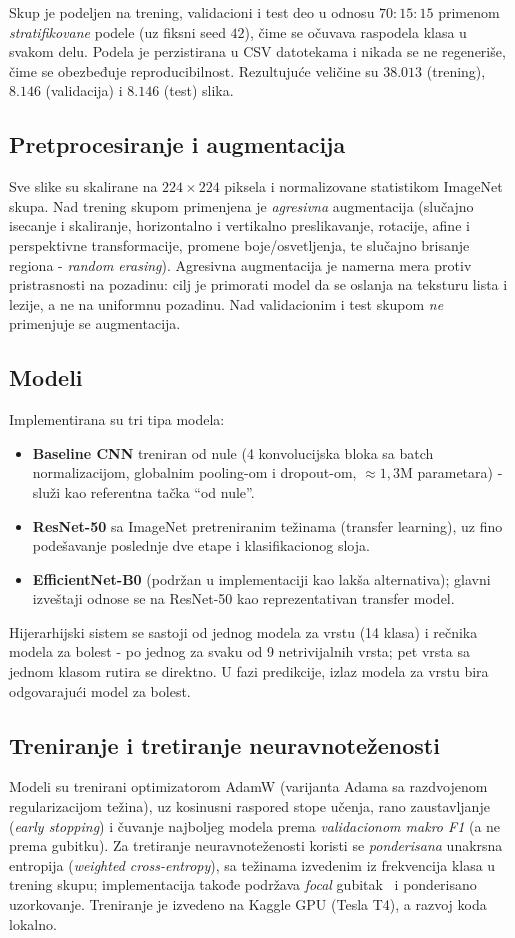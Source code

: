 \documentclass[conference]{IEEEtran}
\begin{document}
Skup je podeljen na trening, validacioni i test deo u odnosu $70{:}15{:}15$
primenom \emph{stratifikovane} podele (uz fiksni seed $42$), čime se očuvava
raspodela klasa u svakom delu. Podela je perzistirana u CSV datotekama i nikada
se ne regeneriše, čime se obezbeđuje reproducibilnost. Rezultujuće veličine su
$38.013$ (trening), $8.146$ (validacija) i $8.146$ (test) slika.

\subsection{Pretprocesiranje i augmentacija}
Sve slike su skalirane na $224\times224$ piksela i normalizovane statistikom
ImageNet skupa. Nad trening skupom primenjena je \emph{agresivna} augmentacija
(slučajno isecanje i skaliranje, horizontalno i vertikalno preslikavanje,
rotacije, afine i perspektivne transformacije, promene boje/osvetljenja, te
slučajno brisanje regiona - \emph{random erasing}). Agresivna augmentacija je
namerna mera protiv pristrasnosti na pozadinu: cilj je primorati model da se
oslanja na teksturu lista i lezije, a ne na uniformnu pozadinu. Nad
validacionim i test skupom \emph{ne} primenjuje se augmentacija.

\subsection{Modeli}
Implementirana su tri tipa modela:
\begin{itemize}
  \item \textbf{Baseline CNN} treniran od nule (4 konvolucijska bloka sa batch
  normalizacijom, globalnim pooling-om i dropout-om, $\approx1{,}3$M parametara)
  - služi kao referentna tačka ``od nule''.
  \item \textbf{ResNet-50} sa ImageNet pretreniranim težinama (transfer
  learning), uz fino podešavanje poslednje dve etape i klasifikacionog sloja.
  \item \textbf{EfficientNet-B0} (podržan u implementaciji kao lakša
  alternativa); glavni izveštaji odnose se na ResNet-50 kao reprezentativan
  transfer model.
\end{itemize}
Hijerarhijski sistem se sastoji od jednog modela za vrstu (14 klasa) i rečnika
modela za bolest - po jednog za svaku od 9 netrivijalnih vrsta; pet vrsta sa
jednom klasom rutira se direktno. U fazi predikcije, izlaz modela za vrstu bira
odgovarajući model za bolest.

\subsection{Treniranje i tretiranje neuravnoteženosti}
Modeli su trenirani optimizatorom AdamW (varijanta Adama sa razdvojenom
regularizacijom težina), uz kosinusni raspored stope učenja, rano zaustavljanje
(\emph{early stopping}) i čuvanje najboljeg modela prema \emph{validacionom makro
F1} (a ne prema gubitku). Za tretiranje neuravnoteženosti koristi se
\emph{ponderisana} unakrsna entropija (\emph{weighted cross-entropy}), sa
težinama izvedenim iz frekvencija klasa u trening skupu; implementacija takođe
podržava \emph{focal} gubitak~\cite{focal2017} i ponderisano uzorkovanje.
Treniranje je izvedeno na Kaggle GPU (Tesla T4), a razvoj koda lokalno.
\end{document}
